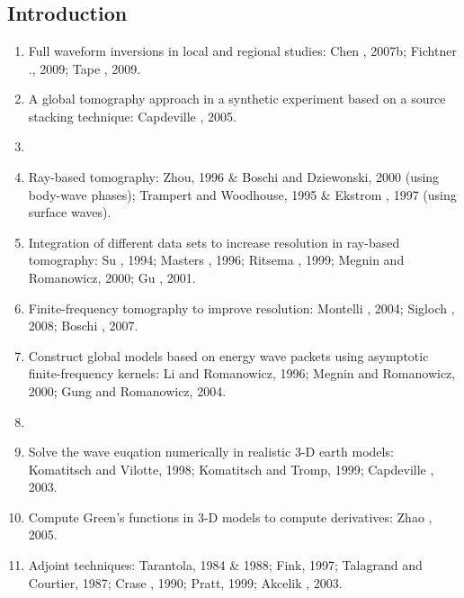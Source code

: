 \renewcommand{\pmk}{Bozdag\_2011\_GJI\_Misfit functions for FWI}
\renewcommand{\prf}{FWI/\pmk.pdf}
\renewcommand{\pti}{Misfit functions for full waveform inversion based on instantaneous phase and envelope measurements}
\renewcommand{\pay}{Ebru Bozdag, Jeannot Trampert and Jeroen Tromp, 2011}
\renewcommand{\pjo}{Geophys. J. Int.}
\renewcommand{\pda}{2017/4/3 Mon.}
\section{\pinfo}
\subsection{Introduction}
\begin{enumerate}[\hspace{10mm}*]
  \item Full waveform inversions in local and regional studies: Chen \etal, 2007b; Fichtner \etal., 2009; Tape \etal, 2009.
  \item A global tomography approach in a synthetic experiment based on a source stacking technique: Capdeville \etal, 2005.
  \item \sline
  \item Ray-based tomography: Zhou, 1996 \& Boschi and Dziewonski, 2000 (using body-wave phases); Trampert and Woodhouse, 1995 \& Ekstrom \etal, 1997 (using surface waves).
  \item Integration of different data sets to increase resolution in ray-based tomography: Su \etal, 1994; Masters \etal, 1996; Ritsema \etal, 1999; Megnin and Romanowicz, 2000; Gu \etal, 2001.
  \item Finite-frequency tomography to improve resolution: Montelli \etal, 2004; Sigloch \etal, 2008; Boschi \etal, 2007.
  \item Construct global models based on energy wave packets using asymptotic finite-frequency kernels: Li and Romanowicz, 1996; Megnin and Romanowicz, 2000; Gung and Romanowicz, 2004.
  \item \sline
  \item Solve the wave euqation numerically in realistic 3-D earth models: Komatitsch and Vilotte, 1998; Komatitsch and Tromp, 1999; Capdeville \etal, 2003.
  \item Compute Green's functions in 3-D models to compute \Frechet derivatives: Zhao \etal, 2005.
  \item Adjoint techniques: Tarantola, 1984 \& 1988; Fink, 1997; Talagrand and Courtier, 1987; Crase \etal, 1990; Pratt, 1999; Akcelik \etal, 2003.

\end{enumerate}
